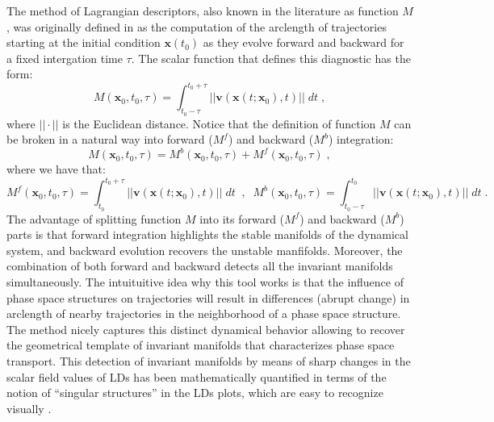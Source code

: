 \documentclass[8pt]{article}
\begin{document}
The method of Lagrangian descriptors, also known in the literature as function $M$, was originally defined in \cite{madrid2009} as the computation of the arclength of trajectories starting at the initial condition $\mathbf{x}(t_0)$ as they evolve forward and backward for a fixed intergation time $\tau$. The scalar function that defines this diagnostic has the form:
\begin{equation}
M(\mathbf{x}_{0},t_0,\tau) = \int^{t_0+\tau}_{t_0-\tau} ||\mathbf{v}(\mathbf{x}(t;\mathbf{x}_0),t)|| \; dt \;,
\label{M_function}
\end{equation}
where $||\cdot||$ is the Euclidean distance. Notice that the definition of function $M$  can be broken in a natural way into forward ($M^f$) and backward ($M^b$) integration:
\begin{equation}
M(\mathbf{x}_{0},t_0,\tau) = M^{b}(\mathbf{x}_{0},t_0,\tau) + M^{f}(\mathbf{x}_{0},t_0,\tau) \;,
\end{equation}
where we have that:
\begin{equation}
M^{f}(\mathbf{x}_{0},t_0,\tau) = \int^{t_0+\tau}_{t_0} ||\mathbf{v}(\mathbf{x}(t;\mathbf{x}_0),t)|| \; dt \;\;,\;\; 
M^{b}(\mathbf{x}_{0},t_0,\tau) = \int^{t_0}_{t_0-\tau} ||\mathbf{v}(\mathbf{x}(t;\mathbf{x}_0),t)|| \; dt \;.
\end{equation}
The advantage of splitting function $M$ into its forward ($M^f$) and backward ($M^b$) parts is that forward integration highlights the stable manifolds of the dynamical system, and backward evolution recovers the unstable manfifolds. Moreover, the combination of both forward and backward detects all the invariant manifolds simultaneously. The intuituitive idea why this tool works is that the influence of phase space structures on trajectories will result in differences (abrupt change) in arclength of nearby trajectories in the neighborhood of a phase space structure. The method nicely captures this distinct dynamical behavior allowing to recover the geometrical template of invariant manifolds that characterizes phase space transport. This detection of invariant manifolds by means of sharp changes in the scalar field values of LDs has been mathematically quantified in terms of the notion of ``singular structures'' in the LDs plots, which are easy to recognize visually \cite{mancho2013lagrangian,lopesino2017}. 
\end{document}
